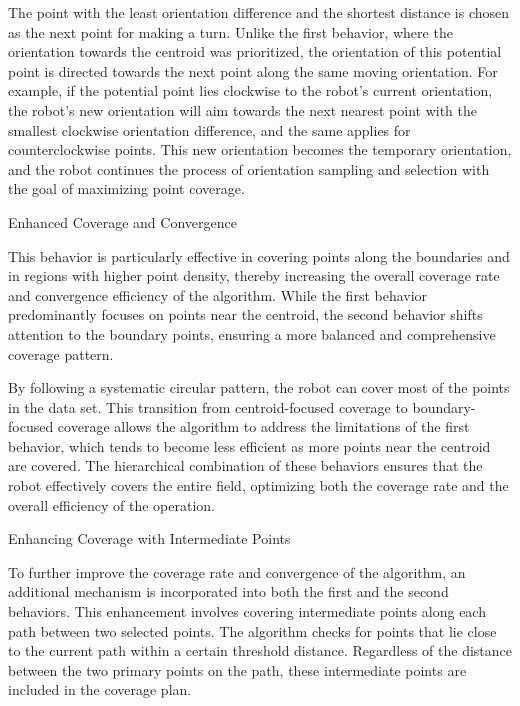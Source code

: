 The point with the least orientation difference and the shortest distance is chosen as the next point for making a turn. Unlike the first behavior, where the orientation towards the centroid was prioritized, the orientation of this potential point is directed towards the next point along the same moving orientation. For example, if the potential point lies clockwise to the robot's current orientation, the robot's new orientation will aim towards the next nearest point with the smallest clockwise orientation difference, and the same applies for counterclockwise points. This new orientation becomes the temporary orientation, and the robot continues the process of orientation sampling and selection with the goal of maximizing point coverage.

\vspace*{6mm}   

Enhanced Coverage and Convergence

This behavior is particularly effective in covering points along the boundaries and in regions with higher point density, thereby increasing the overall coverage rate and convergence efficiency of the algorithm. While the first behavior predominantly focuses on points near the centroid, the second behavior shifts attention to the boundary points, ensuring a more balanced and comprehensive coverage pattern.

\vspace*{6mm}   

By following a systematic circular pattern, the robot can cover most of the points in the data set. This transition from centroid-focused coverage to boundary-focused coverage allows the algorithm to address the limitations of the first behavior, which tends to become less efficient as more points near the centroid are covered. The hierarchical combination of these behaviors ensures that the robot effectively covers the entire field, optimizing both the coverage rate and the overall efficiency of the operation.

\vspace*{6mm}   

Enhancing Coverage with Intermediate Points

To further improve the coverage rate and convergence of the algorithm, an additional mechanism is incorporated into both the first and the second behaviors. This enhancement involves covering intermediate points along each path between two selected points. The algorithm checks for points that lie close to the current path within a certain threshold distance. Regardless of the distance between the two primary points on the path, these intermediate points are included in the coverage plan.

